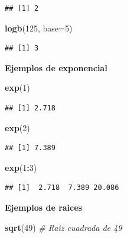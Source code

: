 \documentclass[10pt,]{krantz}
\makeatletter
\newenvironment{Shaded}{\begin{snugshade}}{\end{snugshade}}
\newcommand{\KeywordTok}[1]{\textcolor[rgb]{0.13,0.29,0.53}{\textbf{#1}}}
\newcommand{\DataTypeTok}[1]{\textcolor[rgb]{0.13,0.29,0.53}{#1}}
\newcommand{\DecValTok}[1]{\textcolor[rgb]{0.00,0.00,0.81}{#1}}
\newcommand{\CommentTok}[1]{\textcolor[rgb]{0.56,0.35,0.01}{\textit{#1}}}
\newcommand{\OperatorTok}[1]{\textcolor[rgb]{0.81,0.36,0.00}{\textbf{#1}}}
\newcommand{\NormalTok}[1]{#1}
\newenvironment{kframe}{%
\medskip{}
\setlength{\fboxsep}{.8em}
 \def\at@end@of@kframe{}%
 \ifinner\ifhmode%
  \def\at@end@of@kframe{\end{minipage}}%
  \begin{minipage}{\columnwidth}%
 \fi\fi%
 \def\FrameCommand##1{\hskip\@totalleftmargin \hskip-\fboxsep
 \colorbox{shadecolor}{##1}\hskip-\fboxsep
     \hskip-\linewidth \hskip-\@totalleftmargin \hskip\columnwidth}%
 \MakeFramed {\advance\hsize-\width
   \@totalleftmargin\z@ \linewidth\hsize
   \@setminipage}}%
 {\par\unskip\endMakeFramed%
 \at@end@of@kframe}
\renewenvironment{Shaded}{\begin{kframe}}{\end{kframe}}
\makeatother
\begin{document}
\begin{verbatim}
## [1] 2
\end{verbatim}

\begin{Shaded}
\begin{Highlighting}[]
\KeywordTok{logb}\NormalTok{(}\DecValTok{125}\NormalTok{, }\DataTypeTok{base=}\DecValTok{5}\NormalTok{)}
\end{Highlighting}
\end{Shaded}

\begin{verbatim}
## [1] 3
\end{verbatim}

\textbf{Ejemplos de exponencial}

\begin{Shaded}
\begin{Highlighting}[]
\KeywordTok{exp}\NormalTok{(}\DecValTok{1}\NormalTok{)}
\end{Highlighting}
\end{Shaded}

\begin{verbatim}
## [1] 2.718
\end{verbatim}

\begin{Shaded}
\begin{Highlighting}[]
\KeywordTok{exp}\NormalTok{(}\DecValTok{2}\NormalTok{)}
\end{Highlighting}
\end{Shaded}

\begin{verbatim}
## [1] 7.389
\end{verbatim}

\begin{Shaded}
\begin{Highlighting}[]
\KeywordTok{exp}\NormalTok{(}\DecValTok{1}\OperatorTok{:}\DecValTok{3}\NormalTok{)}
\end{Highlighting}
\end{Shaded}

\begin{verbatim}
## [1]  2.718  7.389 20.086
\end{verbatim}

\textbf{Ejemplos de raices}

\begin{Shaded}
\begin{Highlighting}[]
\KeywordTok{sqrt}\NormalTok{(}\DecValTok{49}\NormalTok{)  }\CommentTok{# Raiz cuadrada de 49}
\end{Highlighting}
\end{Shaded}
\end{document}

